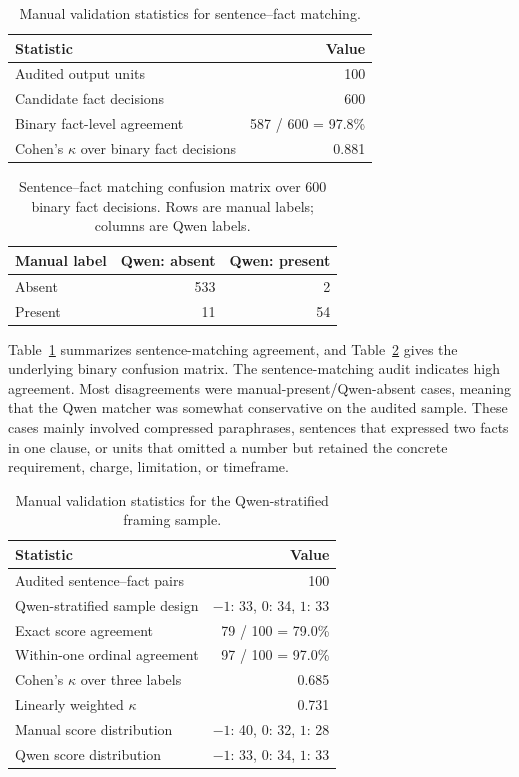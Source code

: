 \documentclass[11pt]{article}
\begin{document}
\begin{table}[t]
\centering
\small
\begin{tabular}{l r}
\hline
Statistic & Value \\
\hline
Audited output units & 100 \\
Candidate fact decisions & 600 \\
Binary fact-level agreement & 587 / 600 = 97.8\% \\
Cohen's $\kappa$ over binary fact decisions & 0.881 \\
\hline
\end{tabular}
\caption{Manual validation statistics for sentence--fact matching.}
\label{tab:sentence-validation-summary}
\end{table}

\begin{table}[t]
\centering
\small
\begin{tabular}{l r r}
\hline
Manual label & Qwen: absent & Qwen: present \\
\hline
Absent & 533 & 2 \\
Present & 11 & 54 \\
\hline
\end{tabular}
\caption{Sentence--fact matching confusion matrix over 600 binary fact decisions. Rows are manual labels; columns are Qwen labels.}
\label{tab:sentence-validation-confusion}
\end{table}

Table~\ref{tab:sentence-validation-summary} summarizes sentence-matching
agreement, and Table~\ref{tab:sentence-validation-confusion} gives the
underlying binary confusion matrix. The sentence-matching audit indicates high agreement. Most disagreements were
manual-present/Qwen-absent cases, meaning that the Qwen matcher was somewhat
conservative on the audited sample. These cases mainly involved compressed
paraphrases, sentences that expressed two facts in one clause, or units that
omitted a number but retained the concrete requirement, charge, limitation, or
timeframe.

\begin{table}[t]
\centering
\small
\begin{tabular}{l r}
\hline
Statistic & Value \\
\hline
Audited sentence--fact pairs & 100 \\
Qwen-stratified sample design & $-1$: 33, $0$: 34, $1$: 33 \\
Exact score agreement & 79 / 100 = 79.0\% \\
Within-one ordinal agreement & 97 / 100 = 97.0\% \\
Cohen's $\kappa$ over three labels & 0.685 \\
Linearly weighted $\kappa$ & 0.731 \\
Manual score distribution & $-1$: 40, $0$: 32, $1$: 28 \\
Qwen score distribution & $-1$: 33, $0$: 34, $1$: 33 \\
\hline
\end{tabular}
\caption{Manual validation statistics for the Qwen-stratified framing sample.}
\label{tab:framing-validation-summary}
\end{table}
\end{document}
